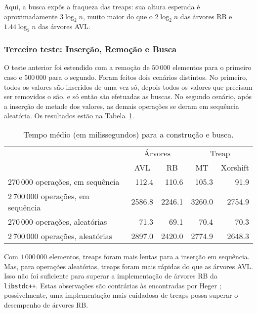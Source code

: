 Aqui, a busca expôs a fraqueza das treaps:
sua altura esperada é aproximadamente $3 \log_2 n$,
muito maior do que o $2\log_2 n$ das árvores RB
e $1.44 \log_2 n$ das árvores AVL.

\subsubsection{Terceiro teste: Inserção, Remoção e Busca}

O teste anterior foi estendido com a remoção de $50\,000$ elementos
para o primeiro caso e $500\,000$ para o segundo.
Foram feitos dois cenários distintos.
No primeiro, todos os valores são inseridos de uma vez só,
depois todos os valores que precisam ser removidos o são,
e só então são efetuadas as buscas.
No segundo cenário, após a inserção de metade dos valores,
as demais operações se deram em sequência aleatória.
Os resultados estão na Tabela~\ref{tab:mixed}.

\begin{table}[h]
    \centering
    \begin{tabular}{l r r r r}
        \cmidrule{2-5}
        & \multicolumn{2}{c}{Árvores} & \multicolumn{2}{c}{Treap} \\
        \cmidrule(r){2-3} \cmidrule(l){4-5}
        & \multicolumn{1}{c}{AVL} & \multicolumn{1}{c}{RB} & \multicolumn{1}{c}{MT} & \multicolumn{1}{c}{Xorshift} \\
        \midrule
        $270\,000$ operações, em sequência & 112.4 & 110.6 & 105.3 & 91.9 \\
        $2\,700\,000$ operações, em sequência & 2586.8 & 2246.1 & 3260.0 & 2754.9 \\
        $270\,000$ operações, aleatórias & 71.3 & 69.1 & 70.4 & 70.3 \\
        $2\,700\,000$ operações, aleatórias & 2897.0 & 2420.0 & 2774.9 & 2648.3 \\
        \bottomrule
    \end{tabular}
    \caption{Tempo médio (em milissegundos) para a construção e busca.}
    \label{tab:mixed}
\end{table}

Com $1\,000\,000$ elementos,
treaps foram mais lentas para a inserção em sequência.
Mas, para operações aleatórias,
treaps foram mais rápidas do que as árvores AVL.
Isso não foi suficiente para superar a implementação de árvores RB da \texttt{libstdc++}.
Estas observações são contrárias às encontradas por Heger \cite[p.65]{Heger2004};
possivelmente,
uma implementação mais cuidadosa de treaps
possa superar o desempenho de árvores RB.
